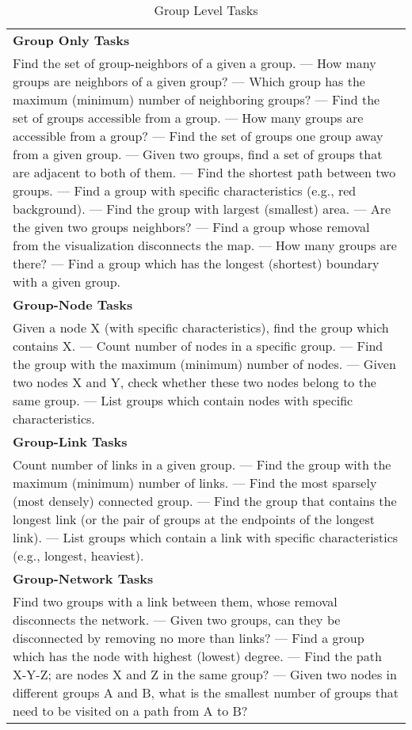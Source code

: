 \documentclass{article}
\newcommand{\Bold}[1]{\textbf{#1}}
\begin{document}
\begin{table}[p]
  \small
  \setlength{\tabulinesep}{7pt}
  \begin{tabu}{X}
    \toprule
    \Bold{Group Only Tasks} \\
    Find the set of group-neighbors of a given a group. ---
    How many groups are neighbors of a given group? ---
    Which group has the maximum (minimum) number of neighboring groups? ---
    Find the set of groups accessible from a group. ---
    How many groups are accessible from a group? ---
    Find the set of groups one group away from a given group. ---
    Given two groups, find a set of groups that are adjacent to both of them. ---
    Find the shortest path between two groups. ---
    Find a group with specific characteristics (e.g., red background). ---
    Find the group with largest (smallest) area. ---
    Are the given two groups neighbors? ---
    Find a group whose removal from the visualization disconnects the map. ---
    How many groups are there? ---
    Find a group which has the longest (shortest) boundary with a given group. \\
    \midrule

    \Bold{Group-Node Tasks} \\
    Given a node X (with specific characteristics), find the group which contains X. ---
    Count number of nodes in a specific group. ---
    Find the group with the maximum (minimum) number of nodes. ---
    Given two nodes X and Y, check whether these two nodes belong to the same group. ---
    List groups which contain nodes with specific characteristics. \\
    \midrule

    \Bold{Group-Link Tasks}  \\
    Count number of links in a given group. ---
    Find the group with the maximum (minimum) number of links. ---
    Find the most sparsely (most densely) connected group. ---
    Find the group that contains the longest link (or the pair of groups at the endpoints of the longest link). ---
    List groups which contain a link with specific characteristics (e.g., longest, heaviest). \\
    \midrule
    
    \Bold{Group-Network Tasks} \\
    Find two groups with a link between them, whose removal disconnects the network. ---
    Given two groups, can they be disconnected by removing no more than  links? ---
    Find a group which has the node with highest (lowest) degree. ---
    Find the path X-Y-Z; are nodes X and Z in the same group? ---
    Given two nodes in different groups A and B, what is the smallest number of groups that need to be visited on a path from A to B? \\
    \bottomrule 
  \end{tabu}
\caption{Group Level Tasks} \label{TAB:tasks}
\end{table}
\end{document}
